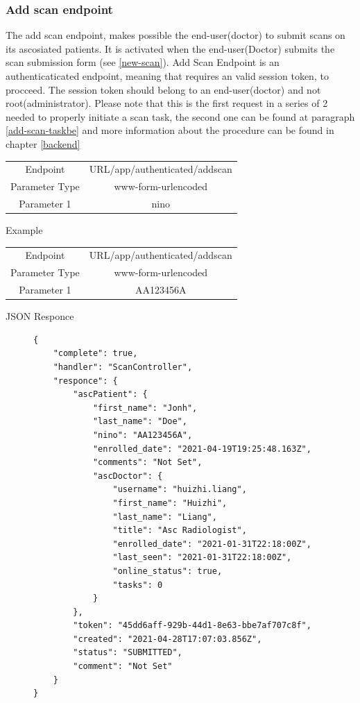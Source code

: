 				\subsubsection{Add scan endpoint}
					The add scan endpoint, makes possible the end-user(doctor) to submit scans on its ascosiated patients. It is 
					activated when the end-user(Doctor) submits the scan submission form (see \ref{new-scan}). Add Scan Endpoint 
					is an authenticaticated endpoint, meaning that requires an valid session token, to procceed. The session token 
					should belong to an end-user(doctor) and not root(administrator). Please note that this is the first request
					in a series of 2 needed to properly initiate a scan task, the second one can be found at paragraph \ref{add-scan-taskbe} 
					and more information about the procedure can be found in chapter \ref{backend}
					\begin{center}
						\begin{tabular}{ |c|c| } 
							\hline
							Endpoint & {{URL}}/app/authenticated/addscan\\
							Parameter Type & www-form-urlencoded  \\
							Parameter 1 & nino  \\
							\hline
						\end{tabular}
					\end{center}
					Example
					\begin{center}
						\begin{tabular}{ |c|c| } 
							\hline
							Endpoint & {{URL}}/app/authenticated/addscan\\
							Parameter Type & www-form-urlencoded  \\
							Parameter 1 & AA123456A  \\
							\hline
						\end{tabular}
					\end{center}
					JSON Responce
					\begin{figure}[H]
						\iftrue
						\begin{lstlisting}[]
{
	"complete": true,
	"handler": "ScanController",
	"responce": {
		"ascPatient": {
			"first_name": "Jonh",
			"last_name": "Doe",
			"nino": "AA123456A",
			"enrolled_date": "2021-04-19T19:25:48.163Z",
			"comments": "Not Set",
			"ascDoctor": {
				"username": "huizhi.liang",
				"first_name": "Huizhi",
				"last_name": "Liang",
				"title": "Asc Radiologist",
				"enrolled_date": "2021-01-31T22:18:00Z",
				"last_seen": "2021-01-31T22:18:00Z",
				"online_status": true,
				"tasks": 0
			}
		},
		"token": "45dd6aff-929b-44d1-8e63-bbe7af707c8f",
		"created": "2021-04-28T17:07:03.856Z",
		"status": "SUBMITTED",
		"comment": "Not Set"
	}
}
						\end{lstlisting}
					\end{figure}
